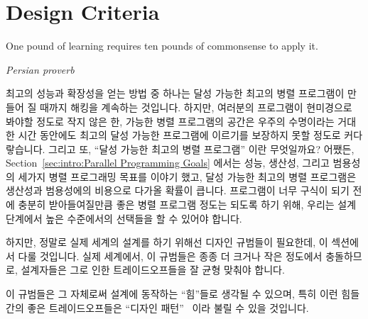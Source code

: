 
\section{Design Criteria}
\label{sec:SMPdesign:Design Criteria}
%
\epigraph{One pound of learning requires ten pounds of commonsense to apply it.}
	 {\emph{Persian proverb}}

최고의 성능과 확장성을 얻는 방법 중 하나는 달성 가능한 최고의 병렬 프로그램이
만들어 질 때까지 해킹을 계속하는 것입니다.
하지만, 여러분의 프로그램이 현미경으로 봐야할 정도로 작지 않은 한, 가능한 병렬
프로그램의 공간은 우주의 수명이라는 거대한 시간 동안에도 최고의 달성 가능한
프로그램에 이르기를 보장하지 못할 정도로 커다랗습니다.
그리고 또, ``달성 가능한 최고의 병렬 프로그램'' 이란 무엇일까요?
어쨌든, Section~\ref{sec:intro:Parallel Programming Goals} 에서는 성능, 생산성,
그리고 범용성의 세가지 병렬 프로그래밍 목표를 이야기 했고, 달성 가능한 최고의
병렬 프로그램은 생산성과 범용성에의 비용으로 다가올 확률이 큽니다.
프로그램이 너무 구식이 되기 전에 충분히 받아들여질만큼 좋은 병렬 프로그램
정도는 되도록 하기 위해, 우리는 설계 단계에서 높은 수준에서의 선택들을 할 수
있어야 합니다.
\iffalse

One way to obtain the best performance and scalability is to simply
hack away until you converge on the best possible parallel program.
Unfortunately, if your program is other than microscopically tiny,
the space of possible parallel programs is so huge
that convergence is not guaranteed in the lifetime of the universe.
Besides, what exactly is the ``best possible parallel program''?
After all, Section~\ref{sec:intro:Parallel Programming Goals}
called out no fewer than three parallel-programming goals of
performance, productivity, and generality,
and the best possible performance will likely come at a cost in
terms of productivity and generality.
We clearly need to be able to make higher-level choices at design
time in order to arrive at an acceptably good parallel program
before that program becomes obsolete.
\fi

하지만, 정말로 실제 세계의 설계를 하기 위해선 디자인 규범들이 필요한데, 이
섹션에서 다룰 것입니다.
실제 세계에서, 이 규범들은 종종 더 크거나 작은 정도에서 충돌하므로, 설계자들은
그로 인한 트레이드오프들을 잘 균형 맞춰야 합니다.

이 규범들은 그 자체로써 설계에 동작하는 ``힘''들로 생각될 수 있으며, 특히 이런
힘들 간의 좋은 트레이드오프들은 ``디자인 패턴''~\cite{Alexander79,GOF95} 이라
불릴 수 있을 것입니다.

